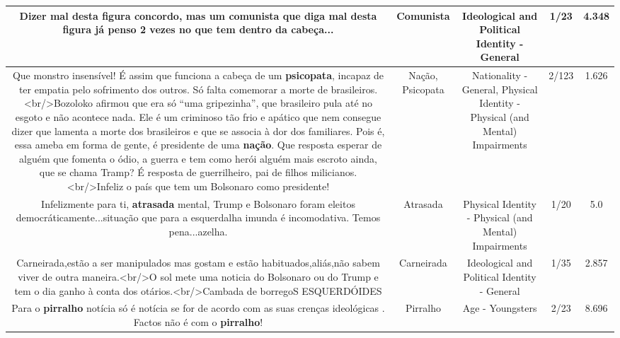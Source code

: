 \documentclass[11pt]{article}
\newlength\mylength
\begin{document}
\begin{center}
\begin{longtable}{|C{.65\mylength}|C{.30\mylength}|C{.12\mylength}|C{.12\mylength}|C{.12\mylength}|}
  \small Dizer mal desta figura concordo, mas um \textbf{comunista} que diga mal desta figura já penso 2 vezes no que tem dentro da cabeça...\normalsize   & Comunista & Ideological and Political Identity - General & 1/23 & 4.348 \\  \hline
  \small Que monstro insensível! É assim que funciona a cabeça de um \textbf{psicopata}, incapaz de ter empatia pelo sofrimento dos outros. Só falta comemorar a morte de brasileiros. <br/>Bozoloko afirmou que era só “uma gripezinha”, que brasileiro pula até no esgoto e não acontece nada. Ele é um criminoso tão frio e apático que nem consegue dizer que lamenta a morte dos brasileiros e que se associa à dor dos familiares. Pois é, essa ameba em forma de gente, é presidente de uma \textbf{nação}.  Que resposta esperar de alguém que fomenta o ódio, a guerra e tem como herói alguém mais escroto ainda, que se chama Tramp? É resposta de guerrilheiro, pai de filhos milicianos. <br/>Infeliz o país que tem um Bolsonaro como presidente!\normalsize   & Nação, Psicopata & Nationality - General, Physical Identity - Physical (and Mental) Impairments & 2/123 & 1.626 \\  \hline
  \small Infelizmente para ti, \textbf{atrasada} mental, Trump e Bolsonaro foram eleitos democráticamente...situação que para a esquerdalha imunda é incomodativa. Temos pena...azelha.\normalsize   & Atrasada & Physical Identity - Physical (and Mental) Impairments & 1/20 & 5.0 \\  \hline
  \small Carneirada,estão a ser manipulados mas gostam e estão habituados,aliás,não sabem viver de outra maneira.<br/>O sol mete uma noticia do Bolsonaro ou do Trump e tem o dia ganho à conta dos otários.<br/>Cambada de borregoS ESQUERDÓIDES\normalsize   & Carneirada & Ideological and Political Identity - General & 1/35 & 2.857 \\  \hline
  \small Para o \textbf{pirralho} notícia só é notícia se for de acordo com as suas crenças ideológicas . Factos não é com o \textbf{pirralho}!\normalsize   & Pirralho & Age - Youngsters & 2/23 & 8.696 \\  \hline

\end{longtable}
\end{center}
\end{document}
